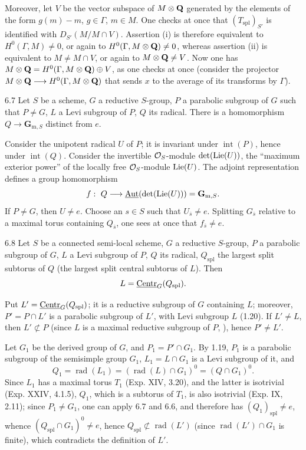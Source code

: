 Moreover, let $V$ be the vector subspace of $M\otimes\mathbf{Q}$ generated by the elements of the form $g(m)-m$, $g\in\Gamma$, $m\in M$. One checks at once that $(T_{\mathrm{spl}})_{S'}$ is identified with $D_{S'}(M/M\cap V)$. Assertion (i) is therefore equivalent to $H^0(\Gamma,M)\neq0$, or again to $H^0(\Gamma,M\otimes\mathbf{Q})\neq0$, whereas assertion (ii) is equivalent to $M\neq M\cap V$, or again to $M\otimes\mathbf{Q}\neq V$. Now one has $M\otimes\mathbf{Q}=H^0(\Gamma,M\otimes\mathbf{Q})\oplus V$, as one checks at once (consider the projector $M\otimes\mathbf{Q}\longrightarrow H^0(\Gamma,M\otimes\mathbf{Q})$ that sends $x$ to the average of its transforms by $\Gamma$).

\begin{lemma}{6.7}\label{XXVI.6.7}
Let $S$ be a scheme, $G$ a reductive $S$-group, $P$ a parabolic subgroup of $G$ such that $P\neq G$, $L$ a Levi subgroup of $P$, $Q$ its radical. There is a homomorphism $Q\to\mathbf{G}_{\mathrm m,S}$ distinct from $e$.
\end{lemma}
Consider the unipotent radical $U$ of $P$; it is invariant under $\operatorname{int}(P)$, hence under $\operatorname{int}(Q)$. Consider the invertible $\mathcal{O}_S$-module $\det(\operatorname{Lie}(U))$, the ``maximum exterior power'' of the locally free $\mathcal{O}_S$-module $\operatorname{Lie}(U)$. The adjoint representation defines a group homomorphism
\[
 f:\ Q\to\underline{\Aut}(\det(\Lie(U)))=\mathbf{G}_{\mathrm m,S}.
\]
If $P\neq G$, then $U\neq e$. Choose an $s\in S$ such that $U_{\overline s}\neq e$. Splitting $G_{\overline s}$ relative to a maximal torus containing $Q_{\overline s}$, one sees at once that $f_{\overline s}\neq e$.

\begin{proposition}{6.8}\label{XXVI.6.8}
Let $S$ be a connected semi-local scheme, $G$ a reductive $S$-group, $P$ a parabolic subgroup of $G$, $L$ a Levi subgroup of $P$, $Q$ its radical, $Q_{\mathrm{spl}}$ the largest split subtorus of $Q$ (\ie the largest split central subtorus of $L$). Then
\[
 L=\underline{\mathrm{Centr}}_G(Q_{\mathrm{spl}}).
\]
\end{proposition}
Put $L'=\underline{\mathrm{Centr}}_G(Q_{\mathrm{spl}})$; it is a reductive subgroup of $G$ containing $L$; moreover, $P'=P\cap L'$ is a parabolic subgroup of $L'$, with Levi subgroup $L$ (1.20). If $L'\neq L$, then $L'\not\subset P$ (since $L$ is a maximal reductive subgroup of $P$, ), hence $P'\neq L'$.

Let $G_1$ be the derived group of $G$, and $P_1=P'\cap G_1$. By 1.19, $P_1$ is a parabolic subgroup of the semisimple group $G_1$, $L_1=L\cap G_1$ is a Levi subgroup of it, and
\[
 Q_1=\operatorname{rad}(L_1)=(\operatorname{rad}(L)\cap G_1)^0=(Q\cap G_1)^0.
\]
Since $L_1$ has a maximal torus $T_1$ (Exp. XIV, 3.20), and the latter is isotrivial (Exp. XXIV, 4.1.5), $Q_1$, which is a subtorus of $T_1$, is also isotrivial (Exp. IX, 2.11); since $P_1\neq G_1$, one can apply 6.7 and 6.6, and therefore has $(Q_1)_{\mathrm{spl}}\neq e$, whence $(Q_{\mathrm{spl}}\cap G_1)^0\neq e$, hence $Q_{\mathrm{spl}}\not\subset\operatorname{rad}(L')$ (since $\operatorname{rad}(L')\cap G_1$ is finite), which contradicts the definition of $L'$.

